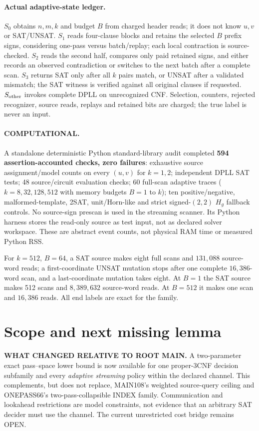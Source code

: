 \documentclass[11pt]{article}
\begin{document}
\paragraph{Actual adaptive-state ledger.}
$S_0$ obtains $n,m,k$ and budget $B$ from charged header reads; it does not know $u,v$ or SAT/UNSAT. $S_1$ reads four-clause blocks and retains the selected $B$ prefix signs, considering one-pass versus batch/replay; each local contraction is source-checked. $S_2$ reads the second half, compares only paid retained signs, and either records an observed contradiction or switches to the next batch after a complete scan. $S_3$ returns SAT only after all $k$ pairs match, or UNSAT after a validated mismatch; the SAT witness is verified against all original clauses if requested. $S_{\rm other}$ invokes complete DPLL on unrecognized CNF. Selection, counters, rejected recognizer, source reads, replays and retained bits are charged; the true label is never an input.

\paragraph{COMPUTATIONAL.}
A standalone deterministic Python standard-library audit completed \textbf{594 assertion-accounted checks, zero failures}: exhaustive source assignment/model counts on every $(u,v)$ for $k=1,2$; independent DPLL SAT tests; 48 source/circuit evaluation checks; 60 full-scan adaptive traces ($k=8,32,128,512$ with memory budgets $B=1$ to $k$); ten positive/negative, malformed-template, 2SAT, unit/Horn-like and strict signed-$(2,2)$ $H_g$ fallback controls. No source-sign prescan is used in the streaming scanner. Its Python harness stores the read-only source as test input, not as declared solver workspace. These are abstract event counts, not physical RAM time or measured Python RSS.

For $k=512$, $B=64$, a SAT source makes eight full scans and $131{,}088$ source-word reads; a first-coordinate UNSAT mutation stops after one complete $16{,}386$-word scan, and a last-coordinate mutation takes eight. At $B=1$ the SAT source makes 512 scans and $8{,}389{,}632$ source-word reads. At $B=512$ it makes one scan and $16{,}386$ reads. All end labels are exact for the family.

\section{Scope and next missing lemma}
\textbf{WHAT CHANGED RELATIVE TO ROOT MAIN.}
A two-parameter exact pass--space lower bound is now available for one proper-3CNF decision subfamily and every \emph{adaptive streaming} policy within the declared channel. This complements, but does not replace, MAIN108's weighted source-query ceiling and ONEPASS66's two-pass-collapsible INDEX family. Communication and lookahead restrictions are model constraints, not evidence that an arbitrary SAT decider must use the channel. The current unrestricted cost bridge remains OPEN.
\end{document}
